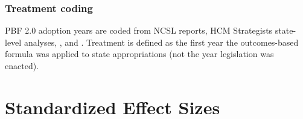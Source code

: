 \documentclass[12pt]{article}
\begin{document}
\subsubsection*{Treatment coding} PBF 2.0 adoption years are coded from NCSL reports, HCM Strategists state-level analyses, \citet{hillman2015performance}, and \citet{dougherty2016performance}. Treatment is defined as the first year the outcomes-based formula was applied to state appropriations (not the year legislation was enacted).

\section{Standardized Effect Sizes}
\label{sec:sde}


\end{document}
